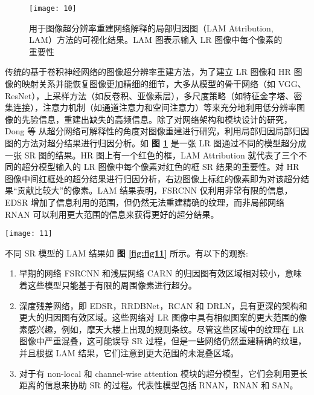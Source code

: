 \begin{figure}[!t]
	\centering
	\texttt{[image: 10]}
	\caption{用于图像超分辨率重建网络解释的局部归因图（LAM Attribution, LAM）方法的可视化结果。LAM 图表示输入 LR 图像中每个像素的重要性}
	\label{fig:fig10}
\end{figure}

传统的基于卷积神经网络的图像超分辨率重建方法，为了建立 LR 图像和 HR 图像的映射关系并能恢复图像更加精细的细节，大多从模型的骨干网络（如 VGG、ResNet），上采样方法（如反卷积、亚像素层），多尺度策略（如特征金字塔、密集连接），注意力机制（如通道注意力和空间注意力）等来充分地利用低分辨率图像的先验信息，重建出缺失的高频信息。除了对网络架构和模块设计的研究， Dong 等 \cite{DBLP:conf/cvpr/GuD21}从超分网络可解释性的角度对图像重建进行研究，利用局部归因局部归因图的方法对超分结果进行归因分析。如 \textbf{图 \ref{fig:fig10}} 是一张 LR 图通过不同的模型超分成一张 SR 图的结果。HR 图上有一个红色的框，LAM Attribution 就代表了三个不同的超分模型输入的 LR 图像中每个像素对红色的框 SR 结果的重要性。对 HR 图像中间红框处的超分结果进行归因分析，右边图像上标红的像素即为对该超分结果``贡献比较大''的像素。LAM 结果表明，FSRCNN 仅利用非常有限的信息，EDSR 增加了信息利用的范围，但仍然无法重建精确的纹理，而非局部网络 RNAN 可以利用更大范围的信息来获得更好的超分结果。

\begin{figure*}[!htbp]
	\centering
	\texttt{[image: 11]}
	\caption{LAM 实验结果}
	\label{fig:fig11}
\end{figure*}

不同 SR 模型的 LAM 结果如 \textbf{图 \ref{fig:fig11}} 所示。有以下的观察:

\begin{enumerate}
	\item 早期的网络 FSRCNN 和浅层网络 CARN 的归因图有效区域相对较小，意味着这些模型只能基于有限的周围像素进行超分。
	\item 深度残差网络，即 EDSR，RRDBNet，RCAN 和 DRLN，具有更深的架构和更大的归因图有效区域。这些网络对 LR 图像中具有相似图案的更大范围的像素感兴趣，例如，摩天大楼上出现的规则条纹。尽管这些区域中的纹理在 LR 图像中严重混叠，这可能误导 SR 过程，但是一些网络仍然重建精确的纹理，并且根据 LAM 结果，它们注意到更大范围的未混叠区域。
	\item 对于有 non-local 和 channel-wise attention 模块的超分模型，它们会利用更长距离的信息来协助 SR 的过程。代表性模型包括 RNAN，RNAN 和 SAN。
\end{enumerate}


